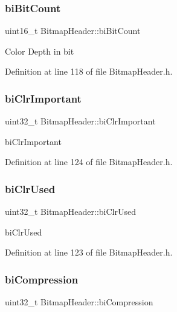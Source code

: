 \subsubsection{\texorpdfstring{biBitCount}{biBitCount}}
{\footnotesize\ttfamily uint16\+\_\+t Bitmap\+Header\+::bi\+Bit\+Count\hspace{0.3cm}{\ttfamily [private]}}

Color Depth in bit 

Definition at line 118 of file Bitmap\+Header.\+h.

\mbox{\label{classBitmapHeader_ad90b0f2883207798cdd26f69af5510ba}} 
\subsubsection{\texorpdfstring{biClrImportant}{biClrImportant}}
{\footnotesize\ttfamily uint32\+\_\+t Bitmap\+Header\+::bi\+Clr\+Important\hspace{0.3cm}{\ttfamily [private]}}

bi\+Clr\+Important 

Definition at line 124 of file Bitmap\+Header.\+h.

\mbox{\label{classBitmapHeader_a621822a0df6f18b2f5f6bbebed1de028}} 
\subsubsection{\texorpdfstring{biClrUsed}{biClrUsed}}
{\footnotesize\ttfamily uint32\+\_\+t Bitmap\+Header\+::bi\+Clr\+Used\hspace{0.3cm}{\ttfamily [private]}}

bi\+Clr\+Used 

Definition at line 123 of file Bitmap\+Header.\+h.

\mbox{\label{classBitmapHeader_a07680e0e463506764ac69707bc51900c}} 
\subsubsection{\texorpdfstring{biCompression}{biCompression}}
{\footnotesize\ttfamily uint32\+\_\+t Bitmap\+Header\+::bi\+Compression\hspace{0.3cm}{\ttfamily [private]}}

